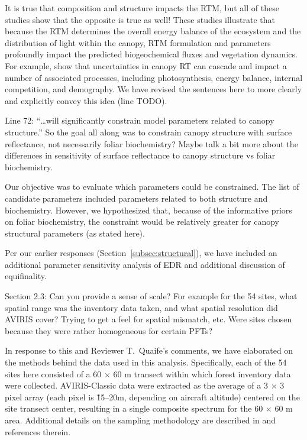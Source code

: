 It is true that composition and structure impacts the RTM, but all of these studies show that the opposite is true as well!
These studies illustrate  that because the RTM determines the overall energy balance of the ecosystem and the distribution of light within the canopy, RTM formulation and parameters profoundly impact the predicted biogeochemical fluxes and vegetation dynamics.
For example, \citet{viskari_2019_influence} show that uncertainties in canopy RT can cascade and impact a number of associated processes, including photosynthesis, energy balance, internal competition, and demography.
We have revised the sentences here to more clearly and explicitly convey this idea (line TODO).

\begin{reviewer}
  Line 72: “\ldots will significantly constrain model parameters related to canopy structure.” So the goal all along was to constrain canopy structure with surface reflectance, not necessarily foliar biochemistry? Maybe talk a bit more about the differences in sensitivity of surface reflectance to canopy structure vs foliar biochemistry.
\end{reviewer}

Our objective was to evaluate which parameters could be constrained.
The list of candidate parameters included parameters related to both structure and biochemistry.
However, we hypothesized that, because of the informative priors on foliar biochemistry, the constraint would be relatively greater for canopy structural parameters (as stated here).

Per our earlier responses (Section~\ref{subsec:structural}), we have included an additional parameter sensitivity analysis of EDR and additional discussion of equifinality.

\begin{reviewer}
  Section 2.3: Can you provide a sense of scale? For example for the 54 sites, what spatial range was the inventory data taken, and what spatial resolution did AVIRIS cover? Trying to get a feel for spatial mismatch, etc. Were sites chosen because they were rather homogeneous for certain PFTs?
\end{reviewer}

In response to this and Reviewer T.\ Quaife’s comments, we have elaborated on the methods behind the data used in this analysis.
Specifically, each of the 54 sites here consisted of a 60 $\times$ 60 m transect within which forest inventory data were collected.
AVIRIS-Classic data were extracted as the average of a 3 $\times$ 3 pixel array (each pixel is \~15--20m, depending on aircraft altitude) centered on the site transect center, resulting in a single composite spectrum for the 60 $\times$ 60 m area.
Additional details on the sampling methodology are described in \citet{singh2015imaging} and references therein.

